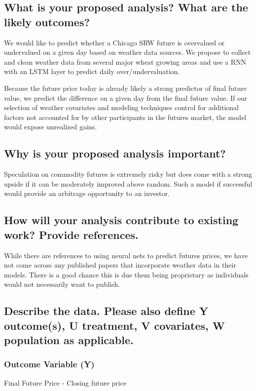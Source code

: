 \documentclass[twoside,11pt]{article}
\begin{document}
\subsection{What is your proposed analysis? What are the likely outcomes?}

We would like to predict whether a Chicago SRW future is overvalued or undervalued on a given day based on weather data sources. We propose to collect and clean weather data from several major wheat growing areas and use a RNN with an LSTM layer to predict daily over/undervaluation. 

Because the future price today is already likely a strong predictor of final future value, we predict the difference on a given day from the final future value. If our selection of weather covariates and modeling techniques control for additional factors not accounted for by other participants in the futures market, the model would expose unrealized gains.  

\subsection{Why is your proposed analysis important?}

Speculation on commodity futures is extremely risky but does come with a strong upside if it can be moderately improved above random. Such a model if successful would provide an arbitrage opportunity to an investor. 

\subsection{How will your analysis contribute to existing work? Provide references.}

While there are references to using neural nets to predict futures prices, we have not come across any published papers that incorporate weather data in their models.  There is a good chance this is due them being proprietary as individuals would not necessarily want to publish.  


\subsection{Describe the data. Please also define Y outcome(s), U treatment, V covariates, W population as applicable.}

\subsubsection{Outcome Variable (Y)}
Final Future Price - Closing future price
\end{document}
